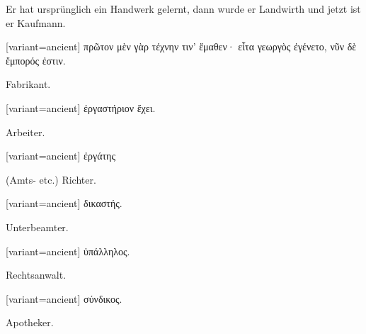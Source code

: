 Er hat ursprünglich ein Handwerk gelernt, dann wurde er Landwirth
und jetzt ist er Kaufmann. 

\switchcolumn

\begin{greek}[variant=ancient]%
πρῶτον μὲν γὰρ τέχνην τιν' ἔμαθεν· εἶτα γεωργὸς ἐγένετο, νῦν δὲ ἔμπορός
ἐστιν.

\end{greek}%
\switchcolumn*\bgroup

\myafterpagetrue{}Fabrikant.

\egroup\switchcolumn\bgroup

\begin{greek}[variant=ancient]%
ἐργαστήριον ἔχει.

\end{greek}%
\egroup\switchcolumn*\bgroup

Arbeiter.

\egroup\switchcolumn\bgroup

\begin{greek}[variant=ancient]%
ἐργάτης

\end{greek}%
\egroup\switchcolumn*\bgroup

(Amts- etc.) Richter. 

\egroup\switchcolumn\bgroup

\begin{greek}[variant=ancient]%
δικαστής.

\end{greek}%
\egroup\switchcolumn*\bgroup

Unterbeamter. 

\egroup\switchcolumn\bgroup

\begin{greek}[variant=ancient]%
ὑπάλληλος.

\end{greek}%
\egroup\switchcolumn*\bgroup

Rechts\textcompwordmark{}anwalt. 

\egroup\switchcolumn\bgroup

\begin{greek}[variant=ancient]%
σύνδικος.

\end{greek}%
\egroup\switchcolumn*\bgroup

Apotheker. 

\egroup\switchcolumn\bgroup

